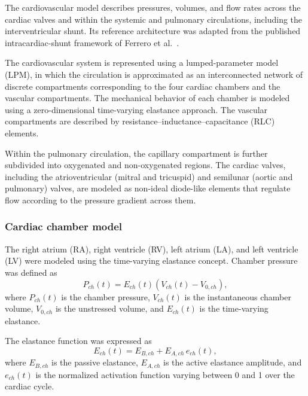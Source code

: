 \documentclass{article}
\begin{document}
The cardiovascular model describes pressures, volumes, and flow rates across the cardiac valves and within the systemic and pulmonary circulations, including the interventricular shunt. Its reference architecture was adapted from the published intracardiac-shunt framework of Ferrero et al.~\cite{Ferrero2026Shunts}.

The cardiovascular system is represented using a lumped-parameter model (LPM), in which the circulation is approximated as an interconnected network of discrete compartments corresponding to the four cardiac chambers and the vascular compartments. The mechanical behavior of each chamber is modeled using a zero-dimensional time-varying elastance approach. The vascular compartments are described by resistance--inductance--capacitance (RLC) elements.

Within the pulmonary circulation, the capillary compartment is further subdivided into oxygenated and non-oxygenated regions. The cardiac valves, including the atrioventricular (mitral and tricuspid) and semilunar (aortic and pulmonary) valves, are modeled as non-ideal diode-like elements that regulate flow according to the pressure gradient across them.

\subsubsection{Cardiac chamber model}

The right atrium (RA), right ventricle (RV), left atrium (LA), and left ventricle (LV) were modeled using the time-varying elastance concept. Chamber pressure was defined as
\begin{equation}
P_{ch}(t) = E_{ch}(t)\left(V_{ch}(t) - V_{0,ch}\right),
\label{eq:chamber_pressure}
\end{equation}
where $P_{ch}(t)$ is the chamber pressure, $V_{ch}(t)$ is the instantaneous chamber volume, $V_{0,ch}$ is the unstressed volume, and $E_{ch}(t)$ is the time-varying elastance.

The elastance function was expressed as
\begin{equation}
E_{ch}(t) = E_{B,ch} + E_{A,ch}\, e_{ch}(t),
\label{eq:elastance_function}
\end{equation}
where $E_{B,ch}$ is the passive elastance, $E_{A,ch}$ is the active elastance amplitude, and $e_{ch}(t)$ is the normalized activation function varying between 0 and 1 over the cardiac cycle.
\end{document}
